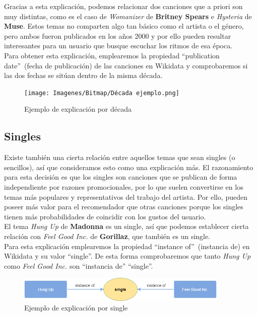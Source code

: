 Gracias a esta explicación, podemos relacionar dos canciones que a priori son muy distintas, como es el caso de \textit{Womanizer} de \textbf{Britney Spears} e \textit{Hysteria} de \textbf{Muse}. Estos temas no comparten algo tan básico como el artista o el género, pero ambos fueron publicados en los años 2000 y por ello pueden resultar interesantes para un usuario que busque escuchar los ritmos de esa época.\\

Para obtener esta explicación, emplearemos la propiedad ``publication date''~(fecha de publicación) de las canciones en Wikidata y comprobaremos si las dos fechas se sitúan dentro de la misma década.\\

\begin{figure}[h!]
	\centering
	\texttt{[image: Imagenes/Bitmap/Década ejemplo.png]}
	\caption{Ejemplo de explicación por década}
	\label{fig:sampleImage}
\end{figure}

\subsection*{Singles}

Existe también una cierta relación entre aquellos temas que sean singles (o sencillos), así que consideramos esto como una explicación más. El razonamiento para esta decisión es que los singles son canciones que se publican de forma independiente por razones promocionales, por lo que suelen convertirse en los temas más populares y representativos del trabajo del artista. Por ello, pueden poseer más valor para el recomendador que otras canciones porque los singles tienen más probabilidades de coincidir con los gustos del usuario.\\

El tema \textit{Hung Up} de \textbf{Madonna} es un single, así que podemos establecer cierta relación con \textit{Feel Good Inc.} de \textbf{Gorillaz}, que también es un single.\\

Para esta explicación emplearemos la propiedad ``instance of''~(instancia de) en Wikidata y su valor ``single''. De esta forma comprobaremos que tanto \textit{Hung Up} como \textit{Feel Good Inc.} son ``instancia de'' ``single''.\\

\begin{figure}[h!]
	\centering
	\includegraphics[width = 0.9\textwidth]{Imagenes/Bitmap/Single ejemplo.png}
	\caption{Ejemplo de explicación por single}
	\label{fig:sampleImage}
\end{figure}

